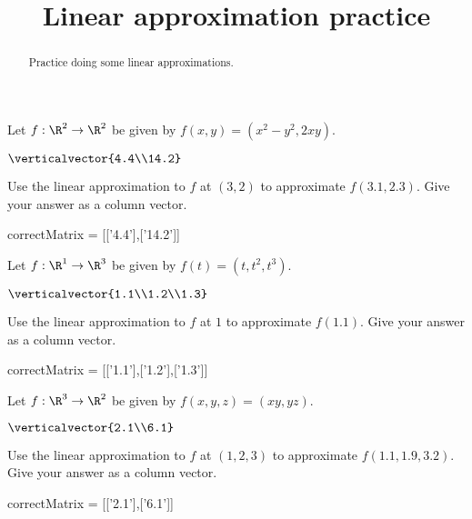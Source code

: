 \documentclass{ximera}
\title{Linear approximation practice}
\begin{document}
	\begin{abstract}
		Practice doing some linear approximations.
	\end{abstract}
	
	\begin{question}
		Let $f:\R^2 \to \R^2$ be given by $f(x,y) = (x^2-y^2,2xy)$.
		\begin{solution}
			\begin{hint}
				$\verticalvector{4.4\\14.2}$
			\end{hint}
			Use the linear approximation to $f$ at $(3,2)$ to approximate $f(3.1,2.3)$.  Give your answer as a column vector.
			\begin{matrix-answer}
				correctMatrix = [['4.4'],['14.2']]
			\end{matrix-answer}
		\end{solution}
	\end{question}
	
	\begin{question}
		Let $f:\R^1 \to \R^3$ be given by $f(t) = (t,t^2,t^3)$.
		\begin{solution}
			\begin{hint}
				$\verticalvector{1.1\\1.2\\1.3}$
			\end{hint}
			Use the linear approximation to $f$ at $1$ to approximate $f(1.1)$.  Give your answer as a column vector.
			\begin{matrix-answer}
				correctMatrix = [['1.1'],['1.2'],['1.3']]
			\end{matrix-answer}
		\end{solution}
	\end{question}
	
    \begin{question}
		Let $f:\R^3\to \R^2$ be given by $f(x,y,z) = (xy,yz)$.
		\begin{solution}
			\begin{hint}
				$\verticalvector{2.1\\6.1}$
			\end{hint}

			Use the linear approximation to $f$ at $(1,2,3)$ to approximate $f(1.1,1.9,3.2)$.  Give your answer as a column vector.
			\begin{matrix-answer}
				correctMatrix = [['2.1'],['6.1']]
			\end{matrix-answer}
		\end{solution}
	\end{question}	
\end{document}
